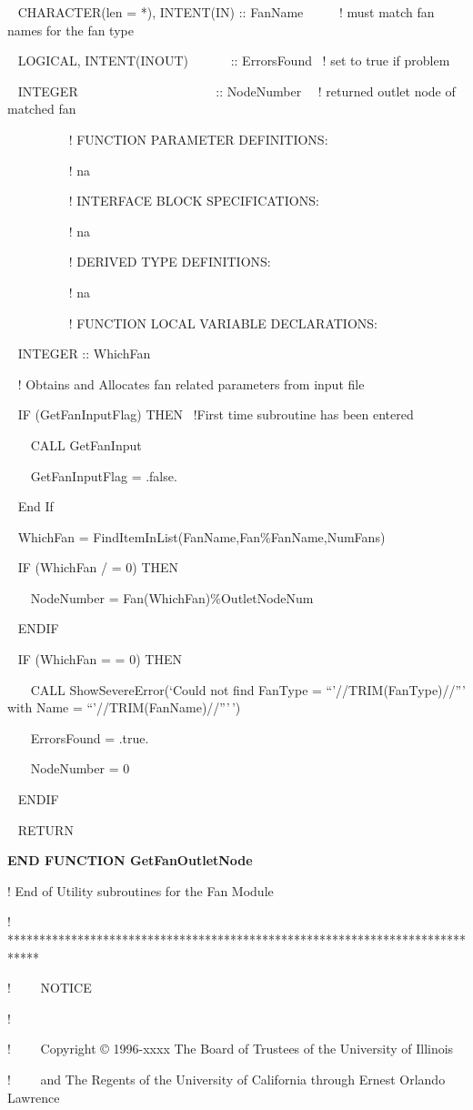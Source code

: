 ~ CHARACTER(len = *), INTENT(IN) :: FanName~~~~~ ! must match fan names for the fan type

~ LOGICAL, INTENT(INOUT)~~~~~~ :: ErrorsFound~ ! set to true if problem

~ INTEGER~~ ~~~~~~~~~~~~~~~~~~~:: NodeNumber~~ ! returned outlet node of matched fan

~~~~~~~~~ ! FUNCTION PARAMETER DEFINITIONS:

~~~~~~~~~ ! na

~~~~~~~~~ ! INTERFACE BLOCK SPECIFICATIONS:

~~~~~~~~~ ! na

~~~~~~~~~ ! DERIVED TYPE DEFINITIONS:

~~~~~~~~~ ! na

~~~~~~~ ~~! FUNCTION LOCAL VARIABLE DECLARATIONS:

~ INTEGER :: WhichFan

~ ! Obtains and Allocates fan related parameters from input file

~ IF (GetFanInputFlag) THEN~ !First time subroutine has been entered

~~~ CALL GetFanInput

~~~ GetFanInputFlag = .false.

~ End If

~ WhichFan = FindItemInList(FanName,Fan\%FanName,NumFans)

~ IF (WhichFan / = 0) THEN

~~~ NodeNumber = Fan(WhichFan)\%OutletNodeNum

~ ENDIF

~ IF (WhichFan = = 0) THEN

~~~ CALL ShowSevereError(`Could not find FanType = ``'//TRIM(FanType)//''' with Name = ``'//TRIM(FanName)//'''\,')

~~~ ErrorsFound = .true.

~~~ NodeNumber = 0

~ ENDIF

~ RETURN

\textbf{END FUNCTION GetFanOutletNode}

! End of Utility subroutines for the Fan Module

! *****************************************************************************

!~~~~ NOTICE

!

!~~~~ Copyright © 1996-xxxx The Board of Trustees of the University of Illinois

!~~~~ and The Regents of the University of California through Ernest Orlando Lawrence

